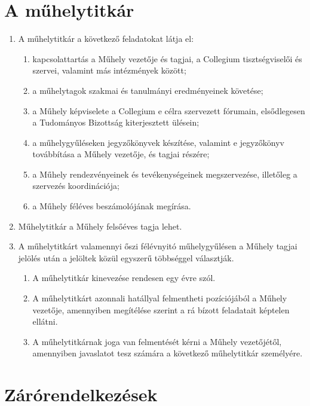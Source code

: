 \documentclass{../styles/rulebook}
\begin{document}
\section{A műhelytitkár}
\begin{enumerate}
	\item A műhelytitkár a következő feladatokat látja el:
	\begin{enumerate}
		\item kapcsolattartás a Műhely vezetője és tagjai, a Collegium tisztségviselői és szervei, valamint más intézmények között;
		\item a műhelytagok szakmai és tanulmányi eredményeinek követése;
		\item a Műhely képviselete a Collegium e célra szervezett fórumain, elsődlegesen a Tudományos Bizottság kiterjesztett ülésein;
		\item a műhelygyűléseken jegyzőkönyvek készítése, valamint e jegyzőkönyv továbbítása a Műhely vezetője, és tagjai részére;
		\item a Műhely rendezvényeinek és tevékenységeinek megszervezése, illetőleg a szervezés koordinációja;
		\item a Műhely féléves beszámolójának megírása.
	\end{enumerate}
	\item Műhelytitkár a Műhely felsőéves tagja lehet.
	\item A műhelytitkárt valamennyi őszi félévnyitó műhelygyűlésen a Műhely tagjai jelölés után a jelöltek közül egyszerű többséggel választják.
	\begin{enumerate}
	    \item  A műhelytitkár kinevezése rendesen egy évre szól.
		\item A műhelytitkárt azonnali hatállyal felmentheti pozíciójából a Műhely vezetője, amennyiben megítélése szerint a rá bízott feladatait képtelen ellátni.
		\item A műhelytitkárnak joga van felmentését kérni a Műhely vezetőjétől, amennyiben javaslatot tesz számára a következő műhelytitkár személyére.
	\end{enumerate}
\end{enumerate}

\section{Zárórendelkezések}
\end{document}
